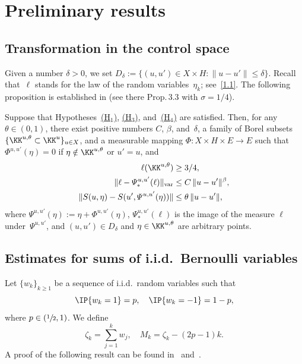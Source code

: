 \section{Preliminary results}
\label{s2}

\subsection{Transformation in the control space}
Given a number $\delta>0$, we set $D_\delta:=\{(u,u')\in X\times H:\|u-u'\|\le\delta\}$. Recall that~$\ell$ stands for the law of the random variables~$\eta_k$; see~\eqref{1.1}. The following proposition is established in \cite[\S3.2]{KNS-2020} (see there Prop.\,3.3 with $\sigma=1/4$).

\begin{proposition}\label{P:2.5}
Suppose that Hypotheses~\hyperlink{H1}{\rm(H$_1$)}, \hyperlink{H3}{\rm(H$_3$)}, and~\hyperlink{H4}{\rm(H$_4$)} are satisfied. Then, for any $\theta\in(0,1)$, there exist positive numbers $C$, $\beta$, and~$\delta$, a family of Borel subsets $\{\KK^{u,\theta}\subset \KK^u\}_{u\in X}$, and a measurable mapping $\varPhi : X\times H \times E \to E$ such that $\varPhi^{u,u'}(\eta)=0$ if $\eta\notin \KK^{u,\theta}$ or $u'=u$, and
\begin{align}
\ell(\KK^{u,\theta})&\ge 3/4,
\label{3.7}\\
\|\ell-\varPsi_*^{u,u'}( \ell)\|_{\mathrm{var}}&\le C\, \|u-u'\|^\beta,
\label{3.8}\\
\|S(u,\eta)- S(u',\varPsi^{u,u'}(\eta))\| &\le \theta\, \|u-u'\|,
\label{3.9}
\end{align}
where $\varPsi^{u,u'}(\eta):=\eta+\varPhi^{u,u'}(\eta)$, $\varPsi_*^{u,u'}( \ell)$ is the image of the measure $\ell$ under~$\varPsi^{u,u'}$, and $(u,u')\in D_\delta$ and $\eta\in \KK^{u,\theta}$ are arbitrary points.
\end{proposition}

\subsection{Estimates for sums of i.i.d.\ Bernoulli variables}
\label{s2.1}
Let $\{w_k\}_{k\ge1}$ be a sequence of i.i.d.\ random variables such that
\[
\IP\{w_k=1\}=p, \quad \IP\{w_k=-1\}=1-p,
\]
where $p\in(\sfrac12,1)$. We define
\begin{equation}\label{2.2}
\zeta_k=\sum_{j=1}^kw_j, \quad M_k=\zeta_k-(2p-1)k.
\end{equation}
A proof of the following result can be found in~\cite[\S 12]{lamperti1996} and~\cite[\S XIV.2]{feller1968}.

